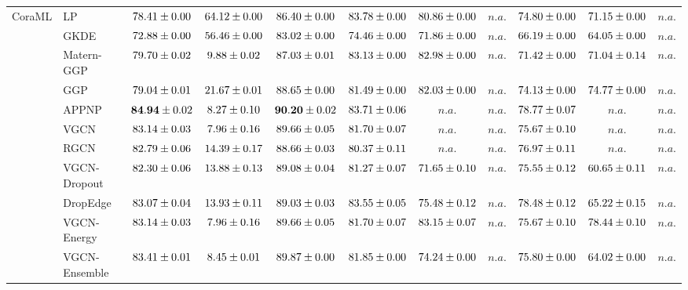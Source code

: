 \begin{table*}[!h]
{\begin{tabular}{ll|cc|cccc|ccc}
        \multirow{14}{*}{CoraML} 
        & LP & ${78.41\tiny \pm 0.00}$ & ${64.12\tiny \pm 0.00}$ & ${86.40\tiny \pm 0.00}$ & ${{83.78}\tiny \pm 0.00}$ & ${80.86\tiny \pm 0.00}$ & $n.a.$ & ${74.80\tiny \pm 0.00}$ & ${71.15\tiny \pm 0.00}$ & $n.a.$\\
        & GKDE & ${72.88\tiny \pm 0.00}$ & ${56.46\tiny \pm 0.00}$ & ${83.02\tiny \pm 0.00}$ & ${74.46\tiny \pm 0.00}$ & ${71.86\tiny \pm 0.00}$ & $n.a.$ & ${66.19\tiny \pm 0.00}$ & ${64.05\tiny \pm 0.00}$ & $n.a.$\\
        & Matern-GGP & ${79.70\tiny \pm 0.02}$ & ${9.88\tiny \pm 0.02}$ & ${87.03\tiny \pm 0.01}$ & ${83.13\tiny \pm 0.00}$ & ${82.98\tiny \pm 0.00}$ & $n.a.$ & ${71.42\tiny \pm 0.00}$ & ${71.04\tiny \pm 0.14}$ & $n.a.$\\
        & GGP & ${79.04\tiny \pm 0.01}$ & ${21.67\tiny \pm 0.01}$ & ${88.65\tiny \pm 0.00}$ & ${81.49\tiny \pm 0.00}$ & ${82.03\tiny \pm 0.00}$ & $n.a.$ & ${74.13\tiny \pm 0.00}$ & ${74.77\tiny \pm 0.00}$ & $n.a.$\\
        & APPNP & ${\mathbf{84.94}\tiny \pm 0.02}$ & ${8.27\tiny \pm 0.10}$ & ${\mathbf{90.20}\tiny \pm 0.02}$ & ${83.71\tiny \pm 0.06}$ & $n.a.$ & $n.a.$ & ${{78.77}\tiny \pm 0.07}$ & $n.a.$ & $n.a.$\\
        & VGCN & ${83.14\tiny \pm 0.03}$ & ${7.96\tiny \pm 0.16}$ & ${89.66\tiny \pm 0.05}$ & ${81.70\tiny \pm 0.07}$ & $n.a.$ & $n.a.$ & ${75.67\tiny \pm 0.10}$ & $n.a.$ & $n.a.$\\
        & RGCN & ${82.79\tiny \pm 0.06}$ & ${14.39\tiny \pm 0.17}$ & ${88.66\tiny \pm 0.03}$ & ${80.37\tiny \pm 0.11}$ & $n.a.$ & $n.a.$ & ${76.97\tiny \pm 0.11}$ & $n.a.$ & $n.a.$\\
        & VGCN-Dropout & ${82.30\tiny \pm 0.06}$ & ${13.88\tiny \pm 0.13}$ & ${89.08\tiny \pm 0.04}$ & ${81.27\tiny \pm 0.07}$ & ${71.65\tiny \pm 0.10}$ & $n.a.$ & ${75.55\tiny \pm 0.12}$ & ${60.65\tiny \pm 0.11}$ & $n.a.$\\
        & DropEdge & ${83.07\tiny \pm 0.04}$ & ${13.93\tiny \pm 0.11}$ & ${89.03\tiny \pm 0.03}$ & ${83.55\tiny \pm 0.05}$ & ${75.48\tiny \pm 0.12}$ & $n.a.$ & ${78.48\tiny \pm 0.12}$ & ${65.22\tiny \pm 0.15}$ & $n.a.$\\
        & VGCN-Energy & ${83.14\tiny \pm 0.03}$ & ${7.96\tiny \pm 0.16}$ & ${89.66\tiny \pm 0.05}$ & ${81.70\tiny \pm 0.07}$ & ${83.15\tiny \pm 0.07}$ & $n.a.$ & ${75.67\tiny \pm 0.10}$ & ${78.44\tiny \pm 0.10}$ & $n.a.$\\
        & VGCN-Ensemble & ${83.41\tiny \pm 0.01}$ & ${8.45\tiny \pm 0.01}$ & ${89.87\tiny \pm 0.00}$ & ${81.85\tiny \pm 0.00}$ & ${74.24\tiny \pm 0.00}$ & $n.a.$ & ${75.80\tiny \pm 0.00}$ & ${64.02\tiny \pm 0.00}$ & $n.a.$\\

\end{tabular}}
\end{table*}
